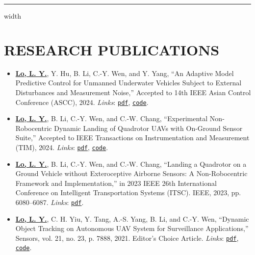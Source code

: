 \documentclass[overlapped]{res}
\newcommand{\pink}[1]{\textcolor{pink!40!red}{#1}} %
\begin{document}
\begin{resume}
\par\noindent\hrule width \linewidth %


\section{RESEARCH PUBLICATIONS}
\begin{itemize}
  \item \underline{\textbf{Lo, L. Y.}}, Y. Hu, B. Li, C.-Y. Wen, and Y. Yang, “An Adaptive Model Predictive Control for Unmanned Underwater Vehicles Subject to External Disturbances and Measurement Noise,” Accepted to 14th IEEE Asian Control Conference (ASCC), 2024. \textit{Links}: \pink{{\texttt{\href{https://pattylo.github.io/assets/pdf/ascc.pdf}{pdf}}}}, \pink{{\texttt{\href{https://github.com/HKPolyU-UAV/bluerov2/tree/eskf_obs2}{code}}}}.
  \item \underline{\textbf{Lo, L. Y.}}, B. Li, C.-Y. Wen, and C.-W. Chang, “Experimental Non-Robocentric Dynamic Landing of Quadrotor UAVs with On-Ground Sensor Suite,” Accepted to IEEE Transactions on Instrumentation and Measurement (TIM), 2024. \textit{Links}: \pink{{\texttt{\href{https://pattylo.github.io/assets/pdf/alan_tim.pdf}{pdf}}}}, \pink{ {\texttt{\href{https://github.com/HKPolyU-UAV/ALAN}{code}}}}.
  \item \underline{\textbf{Lo, L. Y.}}, B. Li, C.-Y. Wen, and C.-W. Chang, “Landing a Quadrotor on a Ground Vehicle without Exteroceptive Airborne Sensors: A Non-Robocentric Framework and Implementation,” in 2023 IEEE 26th International Conference on Intelligent Transportation Systems (ITSC). IEEE, 2023, pp. 6080–6087. \textit{Links}: \pink{{\texttt{\href{https://pattylo.github.io/assets/pdf/alan_conf_final.pdf}{pdf}}}}.
  \item \underline{\textbf{Lo, L. Y.}}, C. H. Yiu, Y. Tang, A.-S. Yang, B. Li, and C.-Y. Wen, “Dynamic Object Tracking on Autonomous UAV System for Surveillance Applications,” Sensors, vol. 21, no. 23, p. 7888, 2021. Editor's Choice Article. \textit{Links}: \pink{{\texttt{\href{https://pattylo.github.io/assets/pdf/sensors-21-07888.pdf}{pdf}}}}, \pink{ {\texttt{\href{https://github.com/HKPolyU-UAV/auto}{code}}}}.
\end{itemize}


\end{resume}
\end{document}
